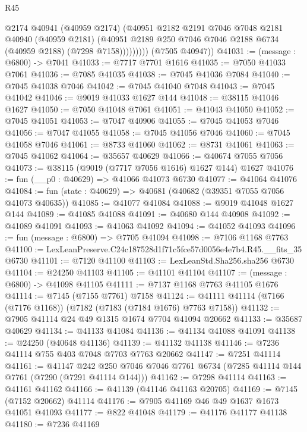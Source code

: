 \begin{lexlean}{R45}
\begin{coremodule}
{                  @2174
                  @40941
                  (@40959 @2174)
                  (@40951
                    @2182
                    @2191
                    @7046
                    @7048
                    @2181
                    @40940
                    (@40959 @2181)
                    (@40951 @2189 @250 @7046 @7046 @2188 @6734 (@40959 @2188) (@7298 @7158)))))))))
      (@7505 @40947))
@41031 := (message : @6800) -> @7041
@41033 := @7717 @7701 @1616
@41035 := @7050 @41033 @7061
@41036 := @7085 @41035
@41038 := @7045 @41036 @7084
@41040 := @7045 @41038 @7046
@41042 := @7045 @41040 @7048
@41043 := @7045 @41042
@41046 := @9019 @41033 @1627 @144
@41048 := @38115 @41046 @1627
@41050 := @7050 @41048 @7061
@41051 := @41043 @41050
@41052 := @7045 @41051
@41053 := @7047 @40906
@41055 := @7045 @41053 @7046
@41056 := @7047 @41055
@41058 := @7045 @41056 @7046
@41060 := @7045 @41058 @7046
@41061 := @8733 @41060
@41062 := @8731 @41061
@41063 := @7045 @41062
@41064 := @35657 @40629
@41066 := @40674 @7055 @7056
@41073 := @38115 (@9019 (@7717 @7056 @1616) @1627 @144) @1627
@41076 := fun (__p0 : @40629) => @41066 @41073 @6730
@41077 := @41064 @41076
@41084 := fun (state : @40629) => @40681 (@40682 (@39351 @7055 @7056 @41073 @40635))
@41085 := @41077 @41084
@41088 := @9019 @41048 @1627 @144
@41089 := @41085 @41088
@41091 := @40680 @144 @40908
@41092 := @41089 @41091
@41093 := @41063 @41092
@41094 := @41052 @41093
@41096 := fun (message : @6800) => @7705 @41094
@41098 := @7106 @1168 @7763
@41100 := LexLeanPreserve.C24c187528d1f71c5fce57d0056e4e7b4.R45.__fits_35 @6730
@41101 := @7120 @41100
@41103 := LexLeanStd.Sha256.sha256 @6730
@41104 := @24250 @41103
@41105 := @41101 @41104
@41107 := (message : @6800) -> @41098 @41105
@41111 := @7137 @1168 @7763 @41105 @1676
@41114 := @7145 (@7155 @7761) @7158
@41124 := @41111 @41114 (@7166 (@7176 @1168)) (@7182 (@7183 (@7184 @1676) @7763 @7158))
@41132 := @7905 @41114 @24 @49 @1315 @1674 @7704 @41094 @20662
@41133 := @35687 @40629
@41134 := @41133 @41084
@41136 := @41134 @41088 @41091
@41138 := @24250 (@40648 @41136)
@41139 := @41132 @41138
@41146 := @7236 @41114 @755 @403 @7048 @7703 @7763 @20662
@41147 := @7251 @41114
@41161 := @41147
    @242
    @250
    @7046
    @7046
    @7761
    @6734
    (@7285 @41114 @144 @7761 (@7290 (@7291 @41114 @144)))
@41162 := @7298 @41114
@41163 := @41161 @41162
@41166 := @41139 (@41146 @41163 @20705)
@41169 := @7145 (@7152 @20662) @41114
@41176 := @7905 @41169 @46 @49 @1637 @1673 @41051 @41093
@41177 := @822 @41048
@41179 := @41176 @41177 @41138
@41180 := @7236 @41169
}
\end{coremodule}
\end{lexlean}
